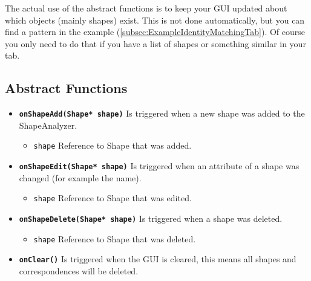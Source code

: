 \begin{mdframed}
	The actual use of the abstract functions is to keep your GUI updated about which objects (mainly shapes) exist. This is not done automatically, but you can find a pattern in the example (\ref{subsec:ExampleIdentityMatchingTab}). Of course you only need to do that if you have a list of shapes or something similar in your tab.
\end{mdframed}

\subsection{Abstract Functions}

\begin{itemize}
	\item \textbf{\texttt{onShapeAdd(Shape* shape)}} Is triggered when a new shape was added to the ShapeAnalyzer. 
	\begin{itemize}
		\item \texttt{shape} Reference to Shape that was added. 
	\end{itemize}
\end{itemize}

\begin{itemize}
	\item \textbf{\texttt{onShapeEdit(Shape* shape)}} Is triggered when an attribute of a shape was changed (for example the name).
	\begin{itemize}
		\item \texttt{shape} Reference to Shape that was edited. 
	\end{itemize}
\end{itemize}

\begin{itemize}
	\item \textbf{\texttt{onShapeDelete(Shape* shape)}} Is triggered when a shape was deleted.
	\begin{itemize}
		\item \texttt{shape} Reference to Shape that was deleted. 
	\end{itemize}
\end{itemize}

\begin{itemize}
	\item \textbf{\texttt{onClear()}} Is triggered when the GUI is cleared, this means all shapes and correspondences will be deleted.
\end{itemize}

